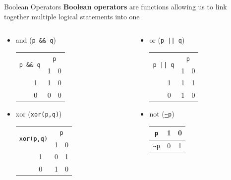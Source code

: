 {}\documentclass[letterpaper,
compress,
xcolor=x11names,
]{beamer}
\begin{document}
\begin{frame}{Boolean Operators}
	\footnotesize
	\textbf{Boolean operators} are functions allowing us to link together multiple logical statements into one
	\begin{columns}
		\begin{column}{0.5\linewidth}
			\begin{itemize}
				\item and (\texttt{p \&\& q}) \\
				\begin{tabular}{c  c || c | c }
					\multicolumn{2}{c}{\multirow{2}{*}{\texttt{p \&\& q}}} & \multicolumn{2}{c}{\texttt{p}} \\
					& & 1 & 0 \\
					\hhline{~=||=|=}
					\multirow{2}{*}{\texttt{q}} & 1 & 1 & 0 \\
					\cline{2-4}
					 & 0 & 0 & 0 \\
				\end{tabular}
				\vspace{0.5cm}
				\item xor (\texttt{xor(p,q)})
				\begin{tabular}{c  c || c | c }
					\multicolumn{2}{c}{\multirow{2}{*}{\texttt{xor(p,q)}}} & \multicolumn{2}{c}{\texttt{p}} \\
					& & 1 & 0 \\
					\hhline{~=||=|=}
					\multirow{2}{*}{\texttt{q}} & 1 & 0 & 1 \\
					\cline{2-4}
					& 0 & 1 & 0 \\
				\end{tabular}	
			\end{itemize}
		\end{column}
		\begin{column}{0.5\linewidth}
			\begin{itemize}
				\item or (\texttt{p || q}) \\
				\begin{tabular}{c  c || c | c }
					\multicolumn{2}{c}{\multirow{2}{*}{\texttt{p || q}}} & \multicolumn{2}{c}{\texttt{p}} \\
					& & 1 & 0 \\
					\hhline{~=||=|=}
					\multirow{2}{*}{\texttt{q}} & 1 & 1 & 1 \\
					\cline{2-4}
					& 0 & 1 & 0 \\
				\end{tabular}
				\vspace{0.5cm}
				\item not (\texttt{\url{~}p}) \\
				\vspace{0.5cm}
				\begin{tabular}{ c || c | c }
					\texttt{p} & 1 & 0 \\
					\hline
					\texttt{\url{~}p} & 0 & 1 \\
				\end{tabular}
				\vspace{0.25cm}
			\end{itemize}
		\end{column}
	\end{columns}
\end{frame}
\end{document}
